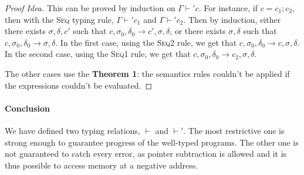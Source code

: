 \begin{proof}[Proof Idea]
  This can be proved by induction on $\Gamma \vdash' c$. For instance, if $c=c_1;c_2$, then with the \textsc{Seq} typing rule, $\Gamma\vdash' c_1$ and $\Gamma\vdash' c_2$.
  Then by induction, either there exists $\sigma,\delta,c'$ such that $c,\sigma_0,\delta_0\longrightarrow c',\sigma,\delta$, or there exists $\sigma,\delta$ such that $c,\sigma_0,\delta_0\longrightarrow \sigma,\delta$.
  In the first case, using the \textsc{Seq2} rule, we get that $c,\sigma_0,\delta_0\longrightarrow c,\sigma,\delta$.
  In the second case, using the \textsc{Seq1} rule, we get that $c,\sigma_0,\delta_0\longrightarrow c_2,\sigma,\delta$.

  The other cases use the \textbf{Theorem 1}: the semantics rules couldn't be applied if the expressions couldn't be evaluated.

\end{proof}

\paragraph{Conclusion}
We have defined two typing relations, $\vdash$ and $\vdash'$. The most restrictive one is strong enough to guarantee progress of the well-typed programs. The other one is not guaranteed to catch every error, as pointer subtraction is allowed and it is thus possible to access memory at a negative address.
